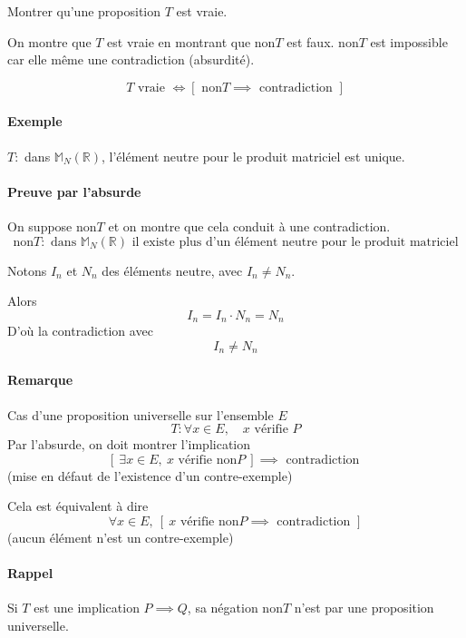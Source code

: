 \documentclass[
    11pt,
    a4paper,
    oneside,
    headinlcude, footinclude,
    twoside,
]{report}
\newcommand\Warning{
    \makebox[1.4em][c]{
    \makebox[-5.5pt][c]{\raisebox{.2em}{!}}
    \makebox[0pt][c]{\color{red}\huge$\bigtriangleup$}}
}
\begin{document}
Montrer qu'une proposition $T$ est vraie.

On montre que $T$  est vraie en montrant que non$T$ est faux. non$T$  est
impossible car elle même une contradiction (absurdité).

$$T \text{ vraie } \iff [\text{ non} T \implies \text{ contradiction }]$$

\paragraph{Exemple}

$T:$ dans $\mathbb{M}_{N}(\mathbb{R})$, l'élément neutre pour le produit
matriciel est unique.

\paragraph{Preuve par l'absurde}
\label{par:preuve_par_l_absurde}

On suppose non$T$ et on montre que cela conduit à une
contradiction. $$\text{non}T: \text{ dans } \mathbb{M}_{N}(\mathbb{R}) \text{ il
existe plus d'un élément neutre pour le produit matriciel} $$

Notons $ I_{n} $ et $ N_{n} $ des éléments neutre, avec $ I_{n} \ne N_{n} $.

Alors $$I_{n} = I_{n} \cdot N_{n} = N_{n}$$ D'où la contradiction avec $$I_{n}
\ne N_{n}$$

\paragraph{Remarque}

Cas d'une proposition universelle sur l'ensemble $E$ $$T: \forall x \in E,
\quad x \text{ vérifie } P$$ Par l'absurde, on doit montrer l'implication $$[\
    \exists x \in E,\ x \text{ vérifie non}P\ ] \implies \text{ contradiction
    } $$ (mise en défaut de l'existence d'un contre-exemple)

Cela est équivalent à dire $$\forall x \in E, \ [\ x \text{ vérifie non}P
    \implies \text{ contradiction } ] $$ (aucun élément n'est un contre-exemple)

\paragraph{Rappel}
\label{par:rappel}

\Warning Si $T$ est une implication $P \implies Q$, sa négation non$T$ n'est
par une proposition universelle.
\end{document}
